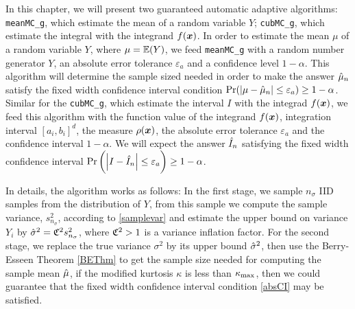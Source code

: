 \documentclass{iitthesis}
\begin{document}
\label{chapter:meanMCabsg}
In this chapter, we will present two guaranteed automatic adaptive algorithms: {\tt meanMC\_g}, which estimate the mean of a random variable $Y$; {\tt cubMC\_g}, which estimate the integral with the integrand $f(\boldsymbol{x})$. In order to estimate the mean $\mu$ of a random variable $Y$, where $\mu = \mathbb{E}(Y)$, we feed {\tt meanMC\_g} with a random number generator $Y$, an absolute error tolerance $\varepsilon_a$ and a confidence level $1-\alpha$. This algorithm will determine the sample sized needed in order to make the answer $\hat{\mu}_n$ satisfy the fixed width confidence interval condition $\Pr (\left \lvert \mu-\hat{\mu}_n \right \rvert \leq \varepsilon_a) \geq 1-\alpha$. Similar for the {\tt cubMC\_g}, which estimate the interval $I$ with the integrad $f(\boldsymbol{x})$, we feed this algorithm with the function value of the integrand $f(\boldsymbol{x})$, integration interval $[a_i,b_i]^d$, the measure $\rho(\boldsymbol{x})$, the absolute error tolerance $\varepsilon_a$ and the confidence interval $1-\alpha$. We will expect the answer $\hat{I}_n$ satisfying the fixed width confidence interval $\Pr \left(\left \lvert I-\hat{I}_n \right \rvert \leq \varepsilon_a\right) \geq 1-\alpha$.

In details, the algorithm works as follows: In the first stage, we sample $n_\sigma$ IID samples from the distribution of $Y$, from this sample we compute the sample variance, $s_{n_\sigma}^2$, according to \eqref{samplevar} and estimate the upper bound on variance $Y_i$ by $\hat{\sigma}^2 = \mathfrak{C}^2s_{n_{\sigma}}^2$, where $\mathfrak{C}^2>1$ is a variance inflation factor. For the second stage, we replace the true variance $\sigma^2$ by its upper bound $\hat{\sigma}^2$, then use the Berry-Esseen Theorem \ref{BEThm} to get the sample size needed for computing the sample mean $\hat{\mu}$, if the modified kurtosis $\kappa$ is less than $\kappa_{\max}$, then we could guarantee that the fixed width confidence interval condition \eqref{absCI} may be satisfied.
\end{document}
